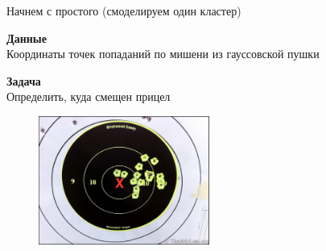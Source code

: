 \documentclass[aspectratio=169]{beamer}
\begin{document}
\begin{frame}{Начнем с простого (смоделируем один кластер)}

{\bf Данные} \\ Координаты точек попаданий по мишени из гауссовской пушки 

{\bf Задача} \\ Определить, куда смещен прицел

\begin{figure}
	\centering
	 \includegraphics[width=0.5\textwidth]{images/target.jpg}       
\end{figure}

\end{frame}
\end{document}
